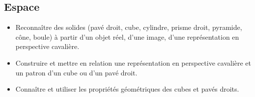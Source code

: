 \documentclass[a4paper,12pt,fleqn]{article}		
\begin{document}
\subsection*{Espace}

\begin{itemize}
	\item {}Reconnaître des solides (pavé droit, cube, cylindre, prisme droit, pyramide, cône, boule) à partir d’un objet réel, d’une image, d’une représentation en perspective cavalière.
	\item {}Construire et mettre en relation une représentation en perspective cavalière et un patron d’un cube ou d’un pavé droit.
	\item {}Connaître et utiliser les propriétés géométriques des cubes et pavés droits.
\end{itemize}
\end{document}
